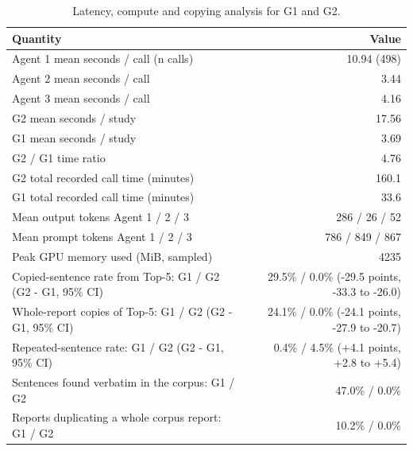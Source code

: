 \begin{table}[t]
\centering
\scriptsize
\begin{tabular}{lr}
\hline
Quantity & Value \\
\hline
Agent 1 mean seconds / call (n calls) & 10.94 (498) \\
Agent 2 mean seconds / call & 3.44 \\
Agent 3 mean seconds / call & 4.16 \\
G2 mean seconds / study & 17.56 \\
G1 mean seconds / study & 3.69 \\
G2 / G1 time ratio & 4.76 \\
G2 total recorded call time (minutes) & 160.1 \\
G1 total recorded call time (minutes) & 33.6 \\
Mean output tokens Agent 1 / 2 / 3 & 286 / 26 / 52 \\
Mean prompt tokens Agent 1 / 2 / 3 & 786 / 849 / 867 \\
Peak GPU memory used (MiB, sampled) & 4235 \\
Copied-sentence rate from Top-5: G1 / G2 (G2 - G1, 95\% CI) & 29.5\% / 0.0\% (-29.5 points, -33.3 to -26.0) \\
Whole-report copies of Top-5: G1 / G2 (G2 - G1, 95\% CI) & 24.1\% / 0.0\% (-24.1 points, -27.9 to -20.7) \\
Repeated-sentence rate: G1 / G2 (G2 - G1, 95\% CI) & 0.4\% / 4.5\% (+4.1 points, +2.8 to +5.4) \\
Sentences found verbatim in the corpus: G1 / G2 & 47.0\% / 0.0\% \\
Reports duplicating a whole corpus report: G1 / G2 & 10.2\% / 0.0\% \\
\hline
\end{tabular}
\caption{Latency, compute and copying analysis for G1 and G2.}
\label{tab:table7_latency_and_copying_analysis}
\end{table}
